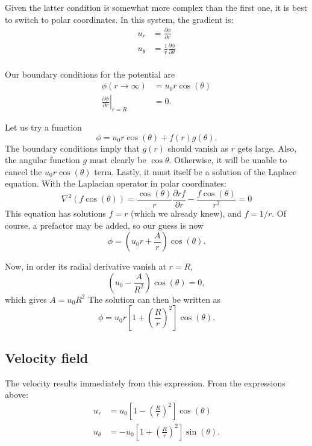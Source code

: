 Given the latter condition is somewhat more complex than the first
one, it is best to switch to polar coordinates. In
this system, the gradient is:
\begin{align}
u_r &= \frac{\partial\phi}{\partial r}\\
u_\theta &= \frac{1}{r} \frac{\partial\phi}{\partial \theta}\\
\end{align}


Our boundary conditions for the potential are
\begin{align}
  \phi(r \to \infty ) &=  u_0 r \cos(\theta)  \\
  \left. \frac{\partial\phi}{\partial r} \right|_{r = R } &= 0  .
\end{align}

Let us try a function
\[
\phi =  u_0 r \cos(\theta)  + f(r) g(\theta) .
\]
The boundary conditions imply that $g(r)$ should vanish as $r$ gets
large. Also, the angular function $g$ must clearly be
$\cos\theta$. Otherwise, it will be unable to cancel the $u_0
r \cos(\theta)$ term. Lastly, it must itself be a solution of the
Laplace equation. With the Laplacian operator in
polar coordinates:
\[
\nabla^2 (f \cos(\theta ) ) =
\frac{ \cos(\theta ) }{r} \frac{\partial r f}{\partial r} -
\frac{ f \cos(\theta ) }{r^2} = 0
\]
This equation has solutions $f=r$ (which we already knew), and
$f=1/r$. Of course, a prefactor may be added, so our guess is now
\begin{equation}
  \label{eq:pot_phi_guess}
  \phi = \left( u_0 r + \frac{A}{r} \right) \cos(\theta) .    
\end{equation}

Now, in order its radial derivative vanish at $r=R$,
\[
 \left ( u_0  - \frac{A}{R^2} \right) \cos(\theta) = 0 ,
\]
which gives $A=u_0 R^2 $ The solution can then be written as
\[
\phi = u_0 r \left[ 1 + \left( \frac{R}{r}\right)^2 \right] \cos(\theta) .
\]

\subsection{Velocity field}

The velocity results immediately from this expression. From the
expressions above:
\begin{align}
u_r     &=   u_0  \left[ 1 - \left( \frac{R}{r}\right)^2 \right] \cos(\theta) \\
u_\theta &=  - u_0  \left[ 1 + \left( \frac{R}{r}\right)^2 \right] \sin(\theta) .
\end{align}

